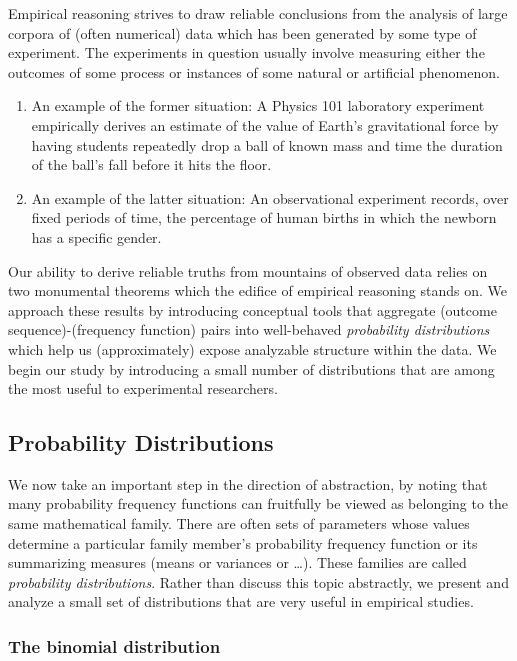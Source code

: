 Empirical reasoning strives to draw reliable conclusions from the analysis of large corpora of (often numerical) data which has been generated by some type of experiment.  The experiments in question usually involve measuring either the outcomes of some process or instances of some natural or artificial phenomenon.
\begin{enumerate}
\item
An example of the former situation:  A Physics 101 laboratory experiment empirically derives an estimate of the value of Earth's gravitational force by having students repeatedly drop a ball of known mass and time the duration of the ball's fall before it hits the floor.

\medskip\item
An example of the latter situation:  An observational experiment records, over fixed periods of time, the percentage of human births in which the newborn has a specific gender.
\end{enumerate}

Our ability to derive reliable truths from mountains of observed data relies on two monumental theorems which the edifice of empirical reasoning stands on.  We approach these results by introducing conceptual tools that aggregate (outcome sequence)-(frequency function) pairs into well-behaved {\it probability distributions} which help us (approximately) expose analyzable structure within the data.  We begin our study by introducing a small number of distributions that are among the most useful to experimental researchers.

\subsection{Probability Distributions}
\label{sec:prob-distr}

We now take an important step in the direction of abstraction, by noting that many probability frequency functions can fruitfully be viewed as belonging to the same mathematical family.  There are often sets of parameters whose values determine a particular family member's probability frequency function or its summarizing measures (means or variances or \ldots). These families are called {\em probability distributions}.  Rather than discuss this topic abstractly, we present and analyze a small set of distributions that are very useful in empirical studies.

\subsubsection{The binomial distribution}
\label{sec:binomial-distribution}

